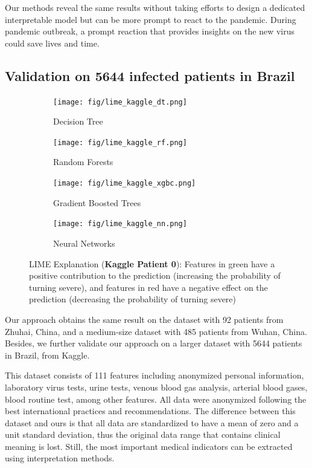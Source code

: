 Our methods reveal the same results without taking efforts to design a dedicated interpretable model but can be more prompt to react to the pandemic. During pandemic outbreak, a prompt reaction that provides insights on the new virus could save lives and time. 

\subsection{\textbf{Validation on 5644 infected patients in Brazil}}

\begin{figure}
\centering
\begin{subfigure}[b]{0.45\textwidth}
    \centering
    \texttt{[image: fig/lime\_kaggle\_dt.png]}
    \caption{Decision Tree}
    \label{fig:lime_kaggle_dt}
\end{subfigure}
\hfill
\begin{subfigure}[b]{0.45\textwidth}
    \centering
    \texttt{[image: fig/lime\_kaggle\_rf.png]}
    \caption{Random Forests}
    \label{fig:lime_kaggle_rf}
\end{subfigure}
\hfill
\begin{subfigure}[b]{0.45\textwidth}
    \centering
    \texttt{[image: fig/lime\_kaggle\_xgbc.png]}
    \caption{Gradient Boosted Trees}
    \label{fig:lime_kaggle_xgbc}
\end{subfigure}
\hfill
\begin{subfigure}[b]{0.45\textwidth}
    \centering
    \texttt{[image: fig/lime\_kaggle\_nn.png]}
    \caption{Neural Networks}
    \label{fig:lime_kaggle_nn}
\end{subfigure}
\hfill
\label{fig:kaggle_lime}
\caption{LIME Explanation (\textbf{Kaggle Patient 0}): Features in green have a positive contribution to the prediction (increasing the probability of turning severe), and features in red have a negative effect on the prediction (decreasing the probability of turning severe)}
\end{figure}

Our approach obtains the same result on the dataset with 92 patients from Zhuhai, China, and a medium-size dataset with 485 patients from Wuhan, China. Besides, we further validate our approach on a larger dataset with 5644 patients in Brazil, from Kaggle.

This dataset consists of 111 features including anonymized personal information, laboratory virus tests, urine tests, venous blood gas analysis, arterial blood gases, blood routine test, among other features. All data were anonymized following the best international practices and recommendations. The difference between this dataset and ours is that all data are standardized to have a mean of zero and a unit standard deviation, thus the original data range that contains clinical meaning is lost. Still, the most important medical indicators can be extracted using interpretation methods.

